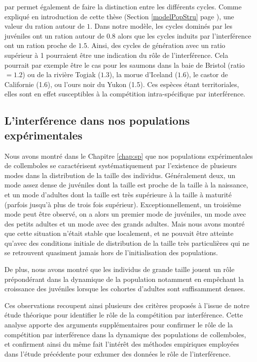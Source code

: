 \begin{enumerate*}[label=(\roman*)]
par \textcites{murdoch2002a} permet également de faire la distinction entre les
différents cycles. Comme expliqué en introduction de cette thèse
(Section \ref{modelPopStru} page \pageref{modelPopStru}), une valeur du ration
autour de $1$. Dans notre modèle, les cycles dominés par les juvéniles ont un
ration autour de $0.8$ alors que les cycles induits par l'interférence ont un
ration proche de $1.5$. Ainsi, des cycles de génération avec un ratio supérieur
à 1 pourraient être une indication du rôle de l'interférence. Cela pourrait par
exemple être le cas pour les saumons dans la baie de Bristol (ratio$=1.2$) ou de
la rivière Togiak ($1.3$), la morue d'Iceland ($1.6$), le castor de Californie
(1.6), ou l'ours noir du Yukon (1.5). Ces espèces étant territoriales, elles
sont en effet susceptibles à la compétition intra-spécifique par interférence. 
\end{enumerate*}

\subsection{L'interférence dans nos populations expérimentales}

Nous avons montré dans le Chapitre \ref{chap:sp} que nos populations
expérimentales de collemboles se caractérisent systématiquement par
l'existence de plusieurs modes dans la distribution de la taille des individus.
Généralement deux, un mode assez dense de juvéniles dont la taille est proche de
la taille à la naissance, et un mode d'adultes dont la taille est très
supérieure à la taille à maturité (parfois jusqu'à plus de trois fois
supérieur). Exceptionnellement, un troisième mode peut être observé, on a alors
un premier mode de juvéniles, un mode avec des petits adultes et un mode avec
des grands adultes. Mais nous avons montré que cette situation n'était stable
que localement, et ne pouvait être atteinte qu'avec des conditions initiale de
distribution de la taille très particulières qui ne se retrouvent quasiment
jamais hors de l'initialisation des populations.

De plus, nous avons montré que les individus de grande taille jouent un rôle
prépondérant dans la dynamique de la population notamment en empêchant la
croissance des juvéniles lorsque les cohortes d'adultes sont suffisamment
denses. 

Ces observations recoupent ainsi plusieurs des critères proposés à l'issue de
notre étude théorique pour identifier le rôle de la compétition par
interférence. Cette analyse apporte des arguments supplémentaires pour confirmer
le rôle de la compétition par interférence dans la dynamique des populations de
collemboles, et confirment ainsi du même fait l'intérêt des méthodes empiriques
employées dans l'étude précédente pour exhumer des données le rôle de
l'interférence.

